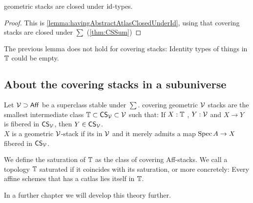 
\begin{lemma}{\label{lemma:geometricStacksClosedUnderId}}
	geometric stacks are closed under $\operatorname{id}$-types.
\end{lemma}
\begin{proof}
	
	This is \ref{lemma:havingAbstractAtlasClosedUnderId}, using that covering stacks are closed under $\sum$ (\ref{thm:CSSum})
\end{proof}

\begin{warning}
	The previous lemma does not hold for covering stacks: Identity types of things in $\mathbb{T}$ could be empty.
\end{warning}

\subsection{About the covering stacks in a subuniverse}
\begin{definition}
	Let $\mathcal{V} \supset \mathsf{Aff}$ be a superclass stable under $\sum$. covering geometric $\mathcal{V}$ stacks are the smallest intermediate class $\mathbb{T} \subset \mathsf{CS}_{\mathcal{V}} \subset \mathcal{V}$ such that: If $X : \mathbb{T}$ ,  $Y : \mathcal{V}$ and $X \to Y$ is fibered in $\mathsf{CS}_{\mathcal{V}}$, then $Y \in \mathsf{CS}_{\mathcal{V}}$. \\
	$X$ is a geometric $\mathcal{V}$-stack if its in $\mathcal{V}$ and it merely admits a map $\operatorname{Spec} A \to X$ fibered in $\mathsf{CS}_{\mathcal{V}}$.
\end{definition}
\begin{definition}
	We define the saturation of $\mathbb{T}$ as the class of covering Aff-stacks. We call a topology $\mathbb{T}$ saturated if it coincides with its saturation, or more concretely: Every affine schemes that has a catlas lies itself in $\mathbb{T}$. \\ 
\end{definition}
In a further chapter we will develop this theory further.



